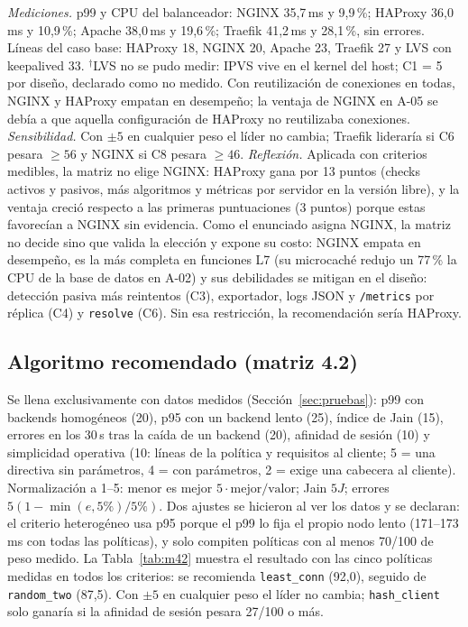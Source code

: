 \documentclass[conference]{IEEEtran}
\begin{document}
\emph{Mediciones.} p99 y CPU del balanceador: NGINX 35,7\,ms y 9,9\,\%; HAProxy 36,0\,ms y 10,9\,\%; Apache 38,0\,ms y 19,6\,\%; Traefik 41,2\,ms y 28,1\,\%, sin errores. Líneas del caso base: HAProxy 18, NGINX 20, Apache 23, Traefik 27 y LVS con keepalived 33. $^\dagger$LVS no se pudo medir: IPVS vive en el kernel del host; C1 = 5 por diseño, declarado como no medido. Con reutilización de conexiones en todas, NGINX y HAProxy empatan en desempeño; la ventaja de NGINX en A-05 se debía a que aquella configuración de HAProxy no reutilizaba conexiones. \emph{Sensibilidad.} Con $\pm5$ en cualquier peso el líder no cambia; Traefik lideraría si C6 pesara $\geq 56$ y NGINX si C8 pesara $\geq 46$. \emph{Reflexión.} Aplicada con criterios medibles, la matriz no elige NGINX: HAProxy gana por 13 puntos (checks activos y pasivos, más algoritmos y métricas por servidor en la versión libre), y la ventaja creció respecto a las primeras puntuaciones (3 puntos) porque estas favorecían a NGINX sin evidencia. Como el enunciado asigna NGINX, la matriz no decide sino que valida la elección y expone su costo: NGINX empata en desempeño, es la más completa en funciones L7 (su microcaché redujo un 77\,\% la CPU de la base de datos en A-02) y sus debilidades se mitigan en el diseño: detección pasiva más reintentos (C3), exportador, logs JSON y \texttt{/metrics} por réplica (C4) y \texttt{resolve} (C6). Sin esa restricción, la recomendación sería HAProxy.

\subsection{Algoritmo recomendado (matriz 4.2)}
Se llena exclusivamente con datos medidos (Sección~\ref{sec:pruebas}): p99 con backends homogéneos (20), p95 con un backend lento (25), índice de Jain (15), errores en los 30\,s tras la caída de un backend (20), afinidad de sesión (10) y simplicidad operativa (10: líneas de la política y requisitos al cliente; 5 = una directiva sin parámetros, 4 = con parámetros, 2 = exige una cabecera al cliente). Normalización a 1--5: menor es mejor $5\cdot\text{mejor}/\text{valor}$; Jain $5J$; errores $5(1-\min(e,5\%)/5\%)$. Dos ajustes se hicieron al ver los datos y se declaran: el criterio heterogéneo usa p95 porque el p99 lo fija el propio nodo lento (171--173\,ms con todas las políticas), y solo compiten políticas con al menos 70/100 de peso medido. La Tabla~\ref{tab:m42} muestra el resultado con las cinco políticas medidas en todos los criterios: se recomienda \texttt{least\_conn} (92,0), seguido de \texttt{random\_two} (87,5). Con $\pm5$ en cualquier peso el líder no cambia; \texttt{hash\_client} solo ganaría si la afinidad de sesión pesara 27/100 o más.
\end{document}
